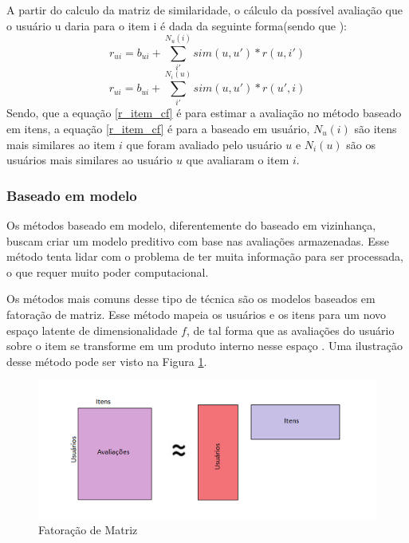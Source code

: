 A partir do calculo da matriz de similaridade, o cálculo da possível avaliação que o usuário u daria para o item i é dada da seguinte forma(sendo que ):
\begin{equation}
\label{r_user_cf}  
r_{ui} = b_{ui} + \sum_{i'}^{N_u(i)} sim(u, u')*r(u, i') 
\end{equation}
\begin{equation}
\label{r_item_cf}  
r_{ui} = b_{ui} + \sum_{i'}^{N_i(u)} sim(u, u')*r(u', i) 
\end{equation}
Sendo, que a equação \ref{r_item_cf} é para estimar a avaliação no método baseado em itens, a equação \ref{r_item_cf} é para a baseado em usuário, \(N_u(i)\) são itens mais similares  ao item \(i\) que foram avaliado pelo usuário \(u\) e \(N_i(u)\) são os usuários mais similares ao usuário \(u\) que avaliaram o item \(i\).
\subsubsection{Baseado em modelo}
Os métodos baseado em modelo, diferentemente do baseado em vizinhança, buscam criar um modelo preditivo com base nas avaliações armazenadas. Esse método tenta lidar com o problema de ter muita informação  para ser processada, o que requer muito poder computacional\cite{thido2010}.

Os métodos mais comuns desse tipo de técnica são os modelos baseados em fatoração de matriz. Esse método mapeia os usuários e os itens para um novo espaço latente de  dimensionalidade \(f\), de tal forma que as avaliações do usuário sobre o item se transforme em um produto interno nesse espaço \cite{koren2015advances}. Uma ilustração desse método pode ser visto na Figura \ref{fig:matrix_fac}.
\begin{figure}[h!]
    \centering
    \includegraphics[width=14cm]{Imagens/matrix_fac.png}
    \caption{Fatoração de Matriz}
    \label{fig:matrix_fac}
\end{figure}

